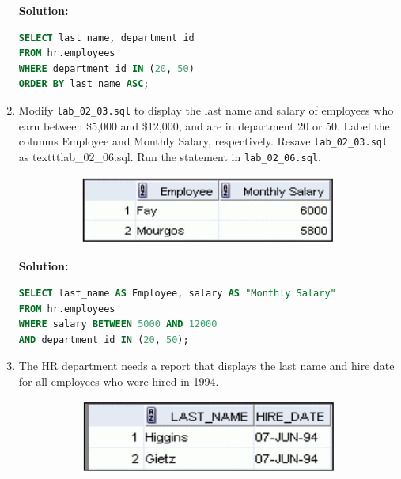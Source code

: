 \documentclass[a4paper,12pt]{article}
\begin{document}
\begin{enumerate}
    \textbf{Solution: }
    \begin{lstlisting}[language=SQL, label={lst:employees_data}]
SELECT last_name, department_id
FROM hr.employees
WHERE department_id IN (20, 50)
ORDER BY last_name ASC;
    \end{lstlisting}
    \item Modify \texttt{lab\_02\_03.sql} to display the last name and salary of employees who earn between
\$5,000 and \$12,000, and are in department 20 or 50. Label the columns Employee and
Monthly Salary, respectively. Resave \texttt{lab\_02\_03.sql} as texttt{lab\_02\_06.sql}. Run the
statement in \texttt{lab\_02\_06.sql}.
\begin{figure}[h]
        \centering
        \begin{subfigure}[b]{0.35\linewidth}
            \centering
            \includegraphics[width=\linewidth]{graphics/26.png}
        \end{subfigure}
    \end{figure}        
    \newpage
    \textbf{Solution: }
    \begin{lstlisting}[language=SQL, label={lst:employees_data}]
SELECT last_name AS Employee, salary AS "Monthly Salary"
FROM hr.employees
WHERE salary BETWEEN 5000 AND 12000
AND department_id IN (20, 50);
    \end{lstlisting}
    \item The HR department needs a report that displays the last name and hire date for all employees
who were hired in 1994.
\begin{figure}[h]
        \centering
        \begin{subfigure}[b]{0.35\linewidth}
            \centering
            \includegraphics[width=\linewidth]{graphics/27.png}
        \end{subfigure}
    \end{figure}        


\end{enumerate}
\end{document}
